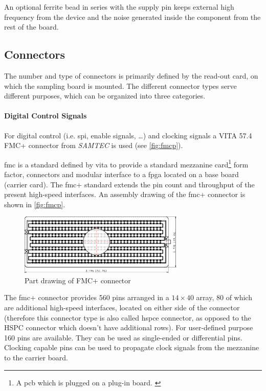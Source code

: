 An optional ferrite bead in series with the supply pin keeps external high frequency from the device and the noise generated inside the component from the rest of the board. \cite{decouple}


\subsection{Connectors}\label{sec:connectors}
The number and type of connectors is primarily defined by the read-out card, on which the sampling board is mounted.
The different connector types serve different purposes, which can be organized into three categories.

\paragraph{Digital Control Signals}
For digital control (i.e. \gls{spi}, enable signals, \ldots) and clocking signals a VITA 57.4 FMC+ connector from \textit{SAMTEC} is used (see \autoref{fig:fmcp}). 

\gls{fmc} is a standard defined by \gls{vita} to provide a standard mezzanine card\footnote{A \gls{pcb} which is plugged on a plug-in board. \cite{mezzanine}} form factor, connectors and modular interface to a \gls{fpga} located on a base board (carrier card). \cite{Seelam2009}
The \gls{fmc}+ standard extends the pin count and throughput of the present high-speed interfaces. 
An assembly drawing of the \gls{fmc}+ connector is shown in \autoref{fig:fmcp}.
\begin{figure}[tbh]
	\centering
	\includegraphics[width = 0.7\textwidth]{chap/04-theresa/img/connectors/fmcp.pdf}
	\caption[Rendering of FMC+ connector]{Part drawing of FMC+ connector \cite{fmcpic}}
	\label{fig:fmcp}
\end{figure}

The \gls{fmc}+ connector provides 560 pins arranged in a $14\times40$ array, 80 of which are additional high-speed interfaces, located on either side of the connector (therefore this connector type is also called \gls{hspce} connector, as opposed to the HSPC connector which doesn't have additional rows).
For user-defined purpose 160 pins are available. 
They can be used as single-ended or differential pins.
Clocking capable pins can be used to propagate clock signals from the mezzanine to the carrier board. 

